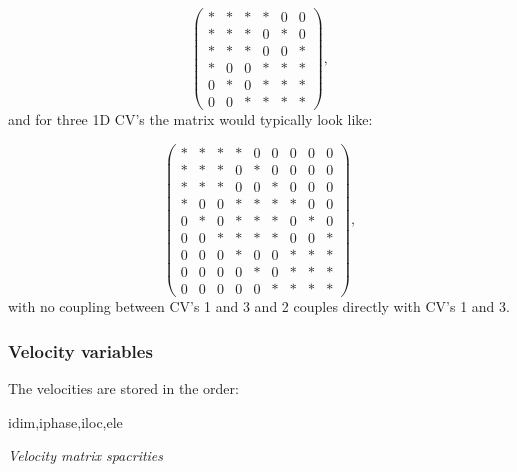 \begin{equation}
  \begin{pmatrix}
*  &  *  &  *      &   *   &  0  &  0  \\ 
*  &  *  &  *      &   0   &  *  &  0  \\ 
*  &  *  &  *      &   0   &  0  &  *  \\ 
%
*  &  0  &  0      &   *   &  *  &  *  \\
0  &  *  &  0      &   *   &  *  &  *  \\
0  &  0  &  *      &   *   &  *  &  *  
  \end{pmatrix},
\label{optimal-CV-mat-spar}
\end{equation}
and for three 1D CV's the matrix would typically look like: 

\begin{equation}
  \begin{pmatrix}
*  &  *  &  *      &   *   &  0  &  0    &   0   &  0  &  0   \\ 
*  &  *  &  *      &   0   &  *  &  0    &   0   &  0  &  0  \\ 
*  &  *  &  *      &   0   &  0  &  *    &   0   &  0  &  0  \\ 
%
*  &  0  &  0      &   *   &  *  &  *    &   *   &  0  &  0  \\
0  &  *  &  0      &   *   &  *  &  *    &   0   &  *  &  0  \\
0  &  0  &  *      &   *   &  *  &  *    &   0   &  0  &  *  \\
%
0  &  0  &  0      &   *   &  0  &  0    &   *   &  *  &  *  \\
0  &  0  &  0      &   0   &  *  &  0    &   *   &  *  &  *  \\
0  &  0  &  0      &   0   &  0  &  *    &   *   &  *  &  *  
  \end{pmatrix},
\label{optimal-CV-mat-spar-3CV}
\end{equation}
with no coupling between CV's 1 and 3 and 2 couples directly with CV's 
1 and 3. 



\subsubsection{Velocity variables} 
The velocities are stored in the order: 
\par\noindent
idim,iphase,iloc,ele


\par\noindent
{\it Velocity matrix spacrities} 

